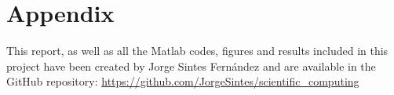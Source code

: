 \section*{Appendix}
This report, as well as all the Matlab codes, figures and results included in this project have been created by Jorge Sintes Fernández and are available in the GitHub repository: \url{https://github.com/JorgeSintes/scientific_computing}